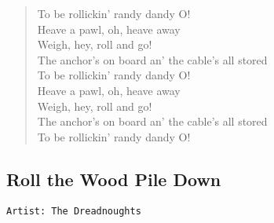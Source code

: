 \documentclass[11pt]{article}
\begin{document}
\begin{verse}
To be rollickin' randy dandy O!\\
\vspace*{1em}
Heave a pawl, oh, heave away\\
Weigh, hey, roll and go!\\
The anchor's on board an' the cable's all stored\\
To be rollickin' randy dandy O!\\
\vspace*{1em}
Heave a pawl, oh, heave away\\
Weigh, hey, roll and go!\\
The anchor's on board an' the cable's all stored\\
To be rollickin' randy dandy O!\\
\end{verse}
\clearpage
\subsection{Roll the Wood Pile Down}
\label{sec:org0f8819e}
\begin{verbatim}
Artist: The Dreadnoughts
\end{verbatim}
\end{document}
